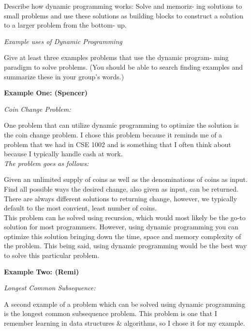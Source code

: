 \documentclass{article}
\begin{document}
\bigskip

\medskip

Describe how dynamic programming works: Solve and memoriz-
ing solutions to small problems and use these solutions as building
blocks to construct a solution to a larger problem from the bottom-
up.

\bigskip

\noindent \textit{Example uses of Dynamic Programming}


Give at least three examples problems that use the dynamic program-
ming paradigm to solve problems. (You should be able to search
finding examples and summarize these in your group’s words.)

\bigskip

\noindent \textbf{Example One: (Spencer)}

\noindent \textit{Coin Change Problem:}

One problem that can utilize dynamic programming to optimize the
solution is the coin change problem. I chose this problem because 
it reminds me of a problem that we had in CSE 1002 and is something
that I often think about because I typically handle cash at work.\\

\noindent \textit{The problem goes as follows:}

Given an unlimited supply of coins as well as the denominations of
coins as input. Find all possible ways the desired change, also given 
as input, can be returned. There are always different solutions to
returning change, however, we typically default to the most convient,
least number of coins.\\

This problem can he solved using recursion, which would most likely be
the go-to solution for most programmers. However, using dynamic programming
you can optimize this solution bringing down the time, space and memory
complexity of the problem. This being said, using dynamic programming would
be the best way to solve this particular problem.

\bigskip

\noindent \textbf{Example Two: (Remi)}

\noindent \textit{Longest Common Subsequence:}

A second example of a problem which can be solved using dynamic programming 
is the longest common subsequence problem. This problem is one that I 
remember learning in data structures $\&$ algorithms, so I chose it for my 
example.\\
\end{document}
